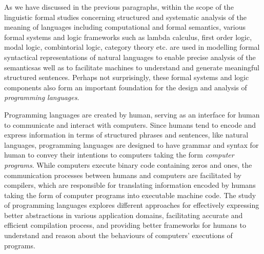 As we have discussed in the previous paragraphs, within the scope of the linguistic formal studies concerning structured and systematic analysis of the meaning of languages including computational and formal semantics, various formal systems and logic frameworks such as lambda calculus, first order logic, modal logic, combintorial logic, category theory etc. are used in modelling formal syntactical representations of natural languages to enable precise analysis of the semanticsas well as to facilitate machines to understand and generate meaningful structured sentences. Perhaps not surprisingly, these formal systems and logic components also form an important foundation for the design and analysis of \emph{programming languages}.

Programming languages are created by human, serving as an interface for human to communicate and interact with computers. Since humans tend to encode and express information in terms of structured phrases and sentences, like natural languages, programming languages are designed to have grammar and syntax for human to convey their intentions to computers taking the form \emph{computer programs}. While computers execute binary code containing zeros and ones, the communication processes between humans and computers are facilitated by compilers, which are responsible for translating information encoded by humans taking the form of computer programs into executable machine code. The study of programming languages explores different approaches for effectively expressing better abstractions in various application domains, facilitating accurate and efficient compilation process, and providing better frameworks for humans to understand and reason about the behaviours of computers' executions of programs.


